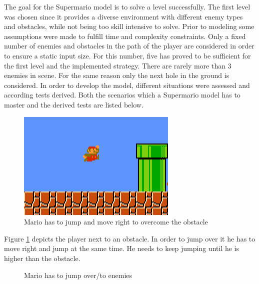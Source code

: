 The goal for the Supermario model is to solve a level successfully. The first level was chosen since it provides a diverse environment with different enemy types and obstacles, while not being too skill intensive to solve. 
Prior to modeling some assumptions were made to fulfill time and complexity constraints.
Only a fixed number of enemies and obstacles in the path of the player are considered in order to ensure a static input size. For this number, five has proved to be sufficient for the first level and the implemented strategy. There are rarely more than 3 enemies in scene. For the same reason only the next hole in the ground is considered.
In order to develop the model, different situations were assessed and according tests derived. Both the scenarios which a Supermario model has to master and the derived tests are listed below.

\begin{figure}[!h]
	\centering
	\includegraphics[scale=0.55]{pictures/haller_mario1.PNG}
	\caption{Mario has to jump and move right to overcome the obstacle}
	\label{fig:marioobstacle}
\end{figure}

Figure \ref{fig:marioobstacle} depicts the player next to an obstacle. In order to jump over it he has to move right and jump at the same time. He needs to keep jumping until he is higher than the obstacle.

\begin{figure} 
	\centering
	\caption{Mario has to jump over/to enemies} 
	\label{fig:marioenemies}
\end{figure} 

